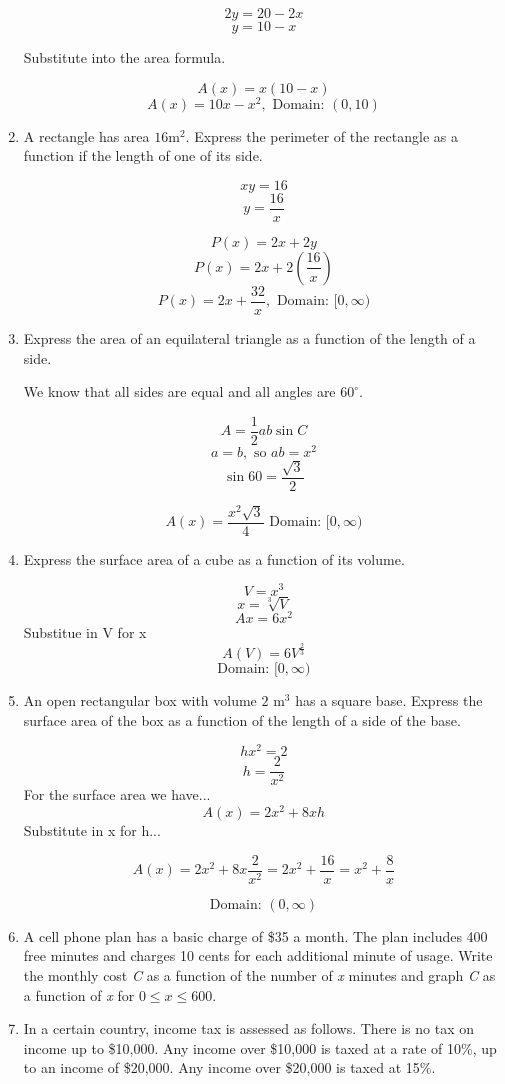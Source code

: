 \documentclass{article}
\begin{document}
\begin{enumerate}
		$$2y = 20 - 2x$$
		$$y = 10 - x$$
		
		Substitute into the area formula.
		
		$$A(x) = x(10 - x)$$
		$$A(x) = 10x - x^2, \text{ Domain: } (0, 10)$$
		
	\item A rectangle has area $16 \text{m}^2$. Express the perimeter of the rectangle as a
		function if the length of one of its side.
		
		$$xy = 16$$
		$$y = \frac{16}{x}$$
		
		$$P(x) = 2x + 2y$$
		$$P(x) = 2x + 2(\frac{16}{x})$$
		$$P(x) = 2x + \frac{32}{x}, \text{ Domain: } [0, \infty)$$
		
	\item Express the area of an equilateral triangle as a function of the length of a side.
	
		We know that all sides are equal and all angles are $60^{\circ}$.

		$$A = \frac{1}{2}ab\sin C$$
		$$ a = b, \text{ so } ab = x^2 $$
		$$\sin 60 = \frac{\sqrt{3}}{2}$$

		$$ A(x) = \frac{x^2\sqrt{3}}{4} \text{ Domain: } [0, \infty)$$

	\item Express the surface area of a cube as a function of its volume.

		$$V = x^3$$
		$$x = \sqrt[3]{V}$$
		$$A{x} = 6 x^2$$
		Substitue in V for x
		$$A(V) = 6 V^{\frac{2}{3}}$$
		$$\text{Domain: } [0, \infty)$$

	\item An open rectangular box with volume $2 \text{ m}^3$ has a square base.
		Express the surface area of the box as a function of the length of a side of the base.

		$$hx^2 = 2$$
		$$h = \frac{2}{x^2}$$
		For the surface area we have...
		$$A(x) = 2x^2 + 8xh$$
		Substitute in x for h...
	
		$$A(x) = 2x^2 + 8x\frac{2}{x^2} = 2x^2 + \frac{16}{x} = x^2 + \frac{8}{x}$$

	 	$$\text{Domain: } (0, \infty)$$

	\item A cell phone plan has a basic charge of \$35 a month. The plan includes 400 free minutes
		and charges 10 cents for each additional minute of usage. Write the monthly cost \emph{C}
		as a function of the number of \emph{x} minutes and graph \emph{C} as a function
		of \emph{x} for $0 \leq x \leq 600$.
		
	\item In a certain country, income tax is assessed as follows. There is no tax on income up to \$10,000.
		Any income over \$10,000 is taxed at a rate of 10\%, up to an income of \$20,000. Any income
		over \$20,000 is taxed at 15\%.
		

\end{enumerate}
\end{document}
